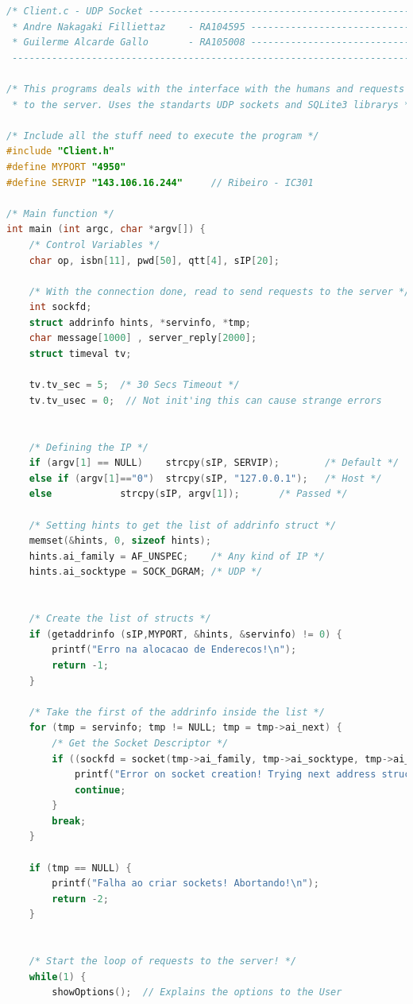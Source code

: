 \documentclass[10pt,a4paper]{report}
\begin{document}
\begin{lstlisting}[language=C]
/* Client.c - UDP Socket ------------------------------------------------------
 * Andre Nakagaki Filliettaz 	- RA104595 --------------------------------------
 * Guilerme Alcarde Gallo 		- RA105008 --------------------------------------
 ----------------------------------------------------------------------------*/

/* This programs deals with the interface with the humans and requests to
 * to the server. Uses the standarts UDP sockets and SQLite3 librarys */

/* Include all the stuff need to execute the program */
#include "Client.h"
#define MYPORT "4950"
#define SERVIP "143.106.16.244"		// Ribeiro - IC301

/* Main function */
int main (int argc, char *argv[]) {
	/* Control Variables */
	char op, isbn[11], pwd[50], qtt[4], sIP[20];

	/* With the connection done, read to send requests to the server */
	int sockfd;
	struct addrinfo hints, *servinfo, *tmp;
	char message[1000] , server_reply[2000];
	struct timeval tv;

	tv.tv_sec = 5;  /* 30 Secs Timeout */
	tv.tv_usec = 0;  // Not init'ing this can cause strange errors


	/* Defining the IP */
	if (argv[1] == NULL)	strcpy(sIP, SERVIP);		/* Default */
	else if (argv[1]=="0")	strcpy(sIP, "127.0.0.1");	/* Host */
	else 			strcpy(sIP, argv[1]);		/* Passed */

	/* Setting hints to get the list of addrinfo struct */
	memset(&hints, 0, sizeof hints);
	hints.ai_family = AF_UNSPEC;	/* Any kind of IP */
	hints.ai_socktype = SOCK_DGRAM;	/* UDP */


	/* Create the list of structs */
	if (getaddrinfo (sIP,MYPORT, &hints, &servinfo) != 0) {
		printf("Erro na alocacao de Enderecos!\n");
		return -1;
	}

	/* Take the first of the addrinfo inside the list */
	for (tmp = servinfo; tmp != NULL; tmp = tmp->ai_next) {
		/* Get the Socket Descriptor */
		if ((sockfd = socket(tmp->ai_family, tmp->ai_socktype, tmp->ai_protocol)) == -1 ) {
			printf("Error on socket creation! Trying next address struct!\n");
			continue;
		}
		break;
	}

	if (tmp == NULL) {
		printf("Falha ao criar sockets! Abortando!\n");
		return -2;
	}


	/* Start the loop of requests to the server! */
	while(1) {
		showOptions();	// Explains the options to the User


\end{lstlisting}
\end{document}
